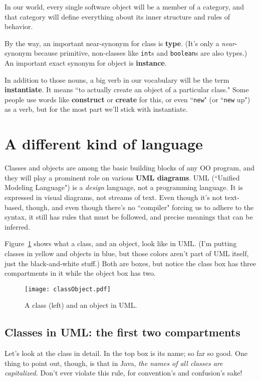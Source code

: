 In our world, every single software object will be a member of a category,
and that category will define everything about its inner structure and rules
of behavior.

By the way, an important near-synonym for class is \textbf{type}. (It's only a
\textit{near}-synonym because primitive, non-classes like \texttt{int}s and
\texttt{boolean}s are also types.) An important exact synonym for object is
\textbf{instance}.

In addition to those nouns, a big verb in our vocabulary will be the term
\textbf{instantiate}. It means ``to actually create an object of a particular
class." Some people use words like \textbf{construct} or \textbf{create} for
this, or even ``\texttt{new}" (or ``\texttt{new} up") as a verb, but for the
most part we'll stick with instantiate.


\section{A different kind of language}
\label{sec:UMLclasses}

Classes and objects are among the basic building blocks of any OO program, and
they will play a prominent role on various \textbf{UML diagrams}. UML
(``Unified Modeling Language") is a \textit{design} language, not a
programming language. It is expressed in visual diagrams, not streams of text.
Even though it's not text-based, though, and even though there's no
``compiler" forcing us to adhere to the syntax, it still has rules that must
be followed, and precise meanings that can be inferred.

Figure~\ref{fig:classObject} shows what a class, and an object, look like in
UML. (I'm putting classes in yellow and objects in blue, but those colors
aren't part of UML itself, just the black-and-white stuff.) Both are boxes,
but notice the class box has three compartments in it while the object box has
two.

\begin{figure}[ht]
\centering
\texttt{[image: classObject.pdf]}   %
\caption{A class (left) and an object in UML.}
\label{fig:classObject}
\end{figure}

\subsection{Classes in UML: the first two compartments}

Let's look at the class in detail. In the top box is its name; so far so good.
One thing to point out, though, is that in Java, \textit{the names of all
classes are capitalized.} Don't ever violate this rule, for convention's and
confusion's sake!

